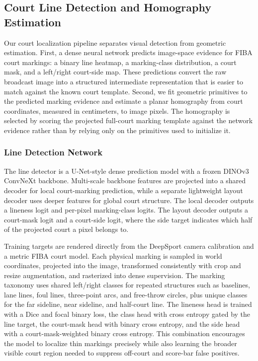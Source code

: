\subsection{Court Line Detection and Homography Estimation}

Our court localization pipeline separates visual detection from geometric estimation.  First, a dense neural network predicts image-space evidence for FIBA court markings: a binary line heatmap, a marking-class distribution, a court mask, and a left/right court-side map.  These predictions convert the raw broadcast image into a structured intermediate representation that is easier to match against the known court template.  Second, we fit geometric primitives to the predicted marking evidence and estimate a planar homography from court coordinates, measured in centimeters, to image pixels.  The homography is selected by scoring the projected full-court marking template against the network evidence rather than by relying only on the primitives used to initialize it.

\subsubsection{Line Detection Network}

The line detector is a U-Net-style dense prediction model with a frozen DINOv3 ConvNeXt backbone.  Multi-scale backbone features are projected into a shared decoder for local court-marking prediction, while a separate lightweight layout decoder uses deeper features for global court structure.  The local decoder outputs a lineness logit and per-pixel marking-class logits.  The layout decoder outputs a court-mask logit and a court-side logit, where the side target indicates which half of the projected court a pixel belongs to.

Training targets are rendered directly from the DeepSport camera calibration and a metric FIBA court model.  Each physical marking is sampled in world coordinates, projected into the image, transformed consistently with crop and resize augmentation, and rasterized into dense supervision.  The marking taxonomy uses shared left/right classes for repeated structures such as baselines, lane lines, foul lines, three-point arcs, and free-throw circles, plus unique classes for the far sideline, near sideline, and half-court line.  The lineness head is trained with a Dice and focal binary loss, the class head with cross entropy gated by the line target, the court-mask head with binary cross entropy, and the side head with a court-mask-weighted binary cross entropy.  This combination encourages the model to localize thin markings precisely while also learning the broader visible court region needed to suppress off-court and score-bar false positives.

